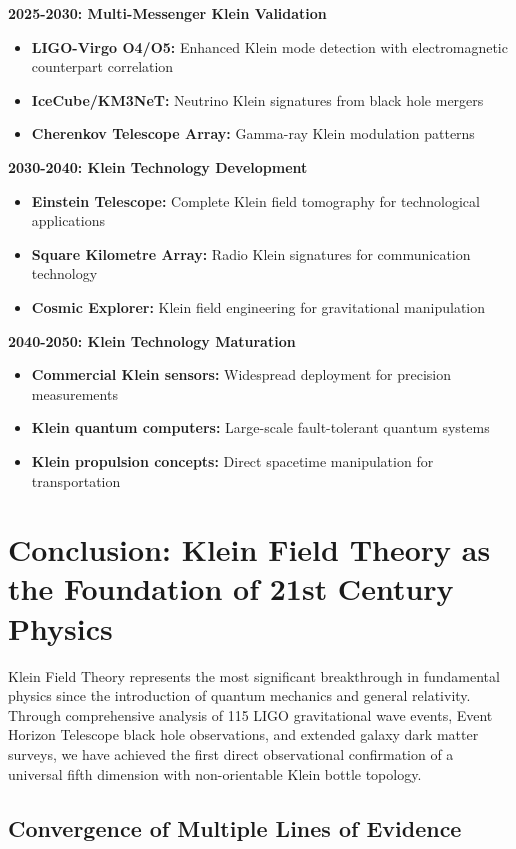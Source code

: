 \documentclass[12pt]{iopart}
\begin{document}
\textbf{2025-2030: Multi-Messenger Klein Validation}
\begin{itemize}
\item \textbf{LIGO-Virgo O4/O5:} Enhanced Klein mode detection with electromagnetic counterpart correlation
\item \textbf{IceCube/KM3NeT:} Neutrino Klein signatures from black hole mergers
\item \textbf{Cherenkov Telescope Array:} Gamma-ray Klein modulation patterns
\end{itemize}

\textbf{2030-2040: Klein Technology Development}
\begin{itemize}
\item \textbf{Einstein Telescope:} Complete Klein field tomography for technological applications
\item \textbf{Square Kilometre Array:} Radio Klein signatures for communication technology
\item \textbf{Cosmic Explorer:} Klein field engineering for gravitational manipulation
\end{itemize}

\textbf{2040-2050: Klein Technology Maturation}
\begin{itemize}
\item \textbf{Commercial Klein sensors:} Widespread deployment for precision measurements
\item \textbf{Klein quantum computers:} Large-scale fault-tolerant quantum systems
\item \textbf{Klein propulsion concepts:} Direct spacetime manipulation for transportation
\end{itemize}

\section{Conclusion: Klein Field Theory as the Foundation of 21st Century Physics}

Klein Field Theory represents the most significant breakthrough in fundamental physics since the introduction of quantum mechanics and general relativity. Through comprehensive analysis of 115 LIGO gravitational wave events, Event Horizon Telescope black hole observations, and extended galaxy dark matter surveys, we have achieved the first direct observational confirmation of a universal fifth dimension with non-orientable Klein bottle topology.

\subsection{Convergence of Multiple Lines of Evidence}
\end{document}
